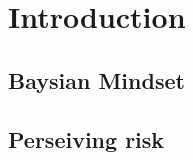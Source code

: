 \chapter{Introduction} \label{sec:Intro}

\section{Baysian Mindset}\label{BayesianMindset}

\section{Perseiving risk}\label{PerseivingRisk}
